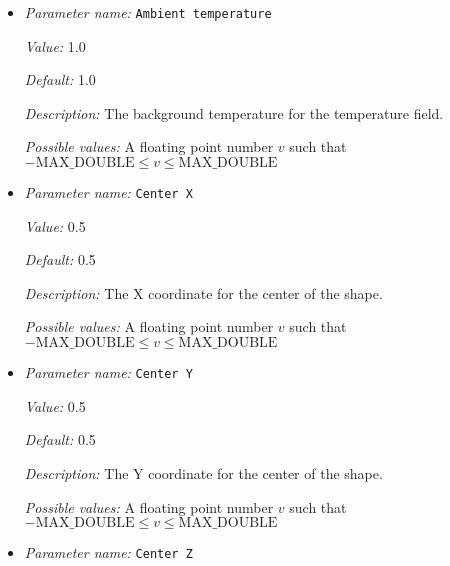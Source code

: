 \begin{itemize}
\item {\it Parameter name:} {\tt Ambient temperature}
\label{parameters:Initial temperature model/Inclusion shape perturbation/Ambient temperature}
\label{parameters:Initial_20temperature_20model/Inclusion_20shape_20perturbation/Ambient_20temperature}


{\it Value:} 1.0


{\it Default:} 1.0


{\it Description:} The background temperature for the temperature field.


{\it Possible values:} A floating point number $v$ such that $-\text{MAX\_DOUBLE} \leq v \leq \text{MAX\_DOUBLE}$
\item {\it Parameter name:} {\tt Center X}
\label{parameters:Initial temperature model/Inclusion shape perturbation/Center X}
\label{parameters:Initial_20temperature_20model/Inclusion_20shape_20perturbation/Center_20X}


{\it Value:} 0.5


{\it Default:} 0.5


{\it Description:} The X coordinate for the center of the shape.


{\it Possible values:} A floating point number $v$ such that $-\text{MAX\_DOUBLE} \leq v \leq \text{MAX\_DOUBLE}$
\item {\it Parameter name:} {\tt Center Y}
\label{parameters:Initial temperature model/Inclusion shape perturbation/Center Y}
\label{parameters:Initial_20temperature_20model/Inclusion_20shape_20perturbation/Center_20Y}


{\it Value:} 0.5


{\it Default:} 0.5


{\it Description:} The Y coordinate for the center of the shape.


{\it Possible values:} A floating point number $v$ such that $-\text{MAX\_DOUBLE} \leq v \leq \text{MAX\_DOUBLE}$
\item {\it Parameter name:} {\tt Center Z}
\label{parameters:Initial temperature model/Inclusion shape perturbation/Center Z}
\label{parameters:Initial_20temperature_20model/Inclusion_20shape_20perturbation/Center_20Z}



\end{itemize}

